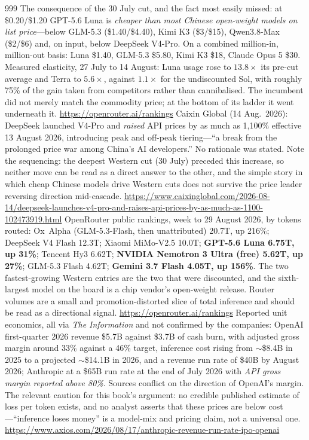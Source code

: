 \begin{thebibliography}{999}
 The consequence of the 30 July cut, and the fact most easily missed: at \$0.20/\$1.20 GPT-5.6 Luna is \emph{cheaper than most Chinese open-weight models on list price}---below GLM-5.3 (\$1.40/\$4.40), Kimi K3 (\$3/\$15), Qwen3.8-Max (\$2/\$6) and, on input, below DeepSeek V4-Pro. On a combined million-in, million-out basis: Luna \$1.40, GLM-5.3 \$5.80, Kimi K3 \$18, Claude Opus 5 \$30. Measured elasticity, 27 July to 14 August: Luna usage rose to $13.8\times$ its pre-cut average and Terra to $5.6\times$, against $1.1\times$ for the undiscounted Sol, with roughly 75\% of the gain taken from competitors rather than cannibalised. The incumbent did not merely match the commodity price; at the bottom of its ladder it went underneath it. \url{https://openrouter.ai/rankings}
 Caixin Global (14 Aug.\ 2026): DeepSeek launched V4-Pro and \emph{raised} API prices by as much as 1{,}100\% effective 13 August 2026, introducing peak and off-peak tiering---``a break from the prolonged price war among China's AI developers.'' No rationale was stated. Note the sequencing: the deepest Western cut (30 July) preceded this increase, so neither move can be read as a direct answer to the other, and the simple story in which cheap Chinese models drive Western cuts does not survive the price leader reversing direction mid-cascade. \url{https://www.caixinglobal.com/2026-08-14/deepseek-launches-v4-pro-and-raises-api-prices-by-as-much-as-1100-102473919.html}
 OpenRouter public rankings, week to 29 August 2026, by tokens routed: Ox~Alpha (GLM-5.3-Flash, then unattributed) 20.7T, up 216\%; DeepSeek V4 Flash 12.3T; Xiaomi MiMo-V2.5 10.0T; \textbf{GPT-5.6 Luna 6.75T, up 31\%}; Tencent Hy3 6.62T; \textbf{NVIDIA Nemotron 3 Ultra (free) 5.62T, up 27\%}; GLM-5.3 Flash 4.62T; \textbf{Gemini 3.7 Flash 4.05T, up 156\%}. The two fastest-growing Western entries are the two that were discounted, and the sixth-largest model on the board is a chip vendor's open-weight release. Router volumes are a small and promotion-distorted slice of total inference and should be read as a directional signal. \url{https://openrouter.ai/rankings}
 Reported unit economics, all via \emph{The Information} and not confirmed by the companies: OpenAI first-quarter 2026 revenue \$5.7B against \$3.7B of cash burn, with adjusted gross margin around 33\% against a 46\% target, inference cost rising from $\sim$\$8.4B in 2025 to a projected $\sim$\$14.1B in 2026, and a revenue run rate of \$40B by August 2026; Anthropic at a \$65B run rate at the end of July 2026 with \emph{API gross margin reported above 80\%}. Sources conflict on the direction of OpenAI's margin. The relevant caution for this book's argument: no credible published estimate of loss per token exists, and no analyst asserts that these prices are below cost---``inference loses money'' is a model-mix and pricing claim, not a universal one. \url{https://www.axios.com/2026/08/17/anthropic-revenue-run-rate-ipo-openai}

\end{thebibliography}
